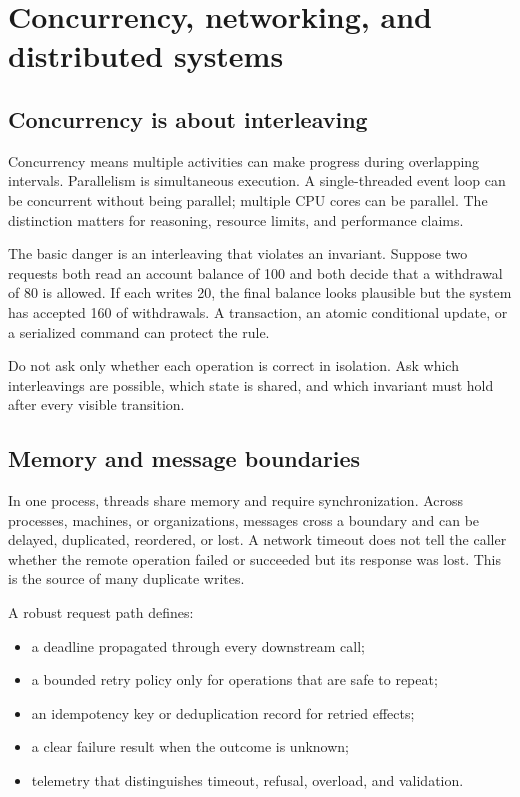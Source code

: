 \chapter{Concurrency, networking, and distributed systems}

\section{Concurrency is about interleaving}
Concurrency means multiple activities can make progress during overlapping
intervals. Parallelism is simultaneous execution. A single-threaded event loop
can be concurrent without being parallel; multiple CPU cores can be parallel.
The distinction matters for reasoning, resource limits, and performance claims.

The basic danger is an interleaving that violates an invariant. Suppose two
requests both read an account balance of 100 and both decide that a withdrawal
of 80 is allowed. If each writes 20, the final balance looks plausible but the
system has accepted 160 of withdrawals. A transaction, an atomic conditional
update, or a serialized command can protect the rule.

\begin{keyidea}
Do not ask only whether each operation is correct in isolation. Ask which
interleavings are possible, which state is shared, and which invariant must hold
after every visible transition.
\end{keyidea}

\section{Memory and message boundaries}
In one process, threads share memory and require synchronization. Across
processes, machines, or organizations, messages cross a boundary and can be
delayed, duplicated, reordered, or lost. A network timeout does not tell the
caller whether the remote operation failed or succeeded but its response was
lost. This is the source of many duplicate writes.

A robust request path defines:

\begin{itemize}
  \item a deadline propagated through every downstream call;
  \item a bounded retry policy only for operations that are safe to repeat;
  \item an idempotency key or deduplication record for retried effects;
  \item a clear failure result when the outcome is unknown;
  \item telemetry that distinguishes timeout, refusal, overload, and validation.
\end{itemize}

